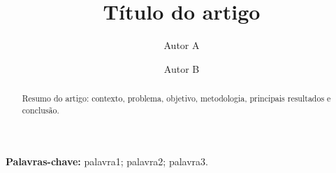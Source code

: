\documentclass[11pt,a4paper]{article}
\title{Título do artigo}
\author{Autor A \and Autor B}
\date{}
\begin{document}
\maketitle

\begin{abstract}
Resumo do artigo: contexto, problema, objetivo, metodologia, principais
resultados e conclusão.
\end{abstract}

\noindent\textbf{Palavras-chave:} palavra1; palavra2; palavra3.









% 
% 
\end{document}
